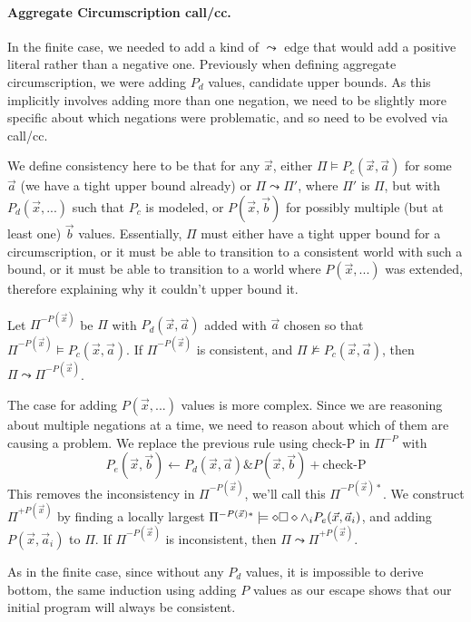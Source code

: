 \paragraph{Aggregate Circumscription call/cc.}
In the finite case, we needed to add a kind of $\leadsto$ edge that would add a positive literal rather than a negative one.
Previously when defining aggregate circumscription, we were adding $P_d$ values, candidate upper bounds.
As this implicitly involves adding more than one negation, we need to be slightly more specific about which negations were problematic, and so need to be evolved via call/cc.

We define consistency here to be that for any $\vec{x}$, either $\Pi \models P_c(\vec{x}, \vec{a})$ for some $\vec{a}$ (we have a tight upper bound already) or $\Pi \leadsto \Pi'$, where $\Pi'$ is $\Pi$, but with $P_d(\vec{x}, ...)$ such that $P_c$ is modeled, or $P(\vec{x}, \vec{b})$ for possibly multiple (but at least one) $\vec{b}$ values.
Essentially, $\Pi$ must either have a tight upper bound for a circumscription, or it must be able to transition to a consistent world with such a bound, or it must be able to transition to a world where $P(\vec{x}, ...)$ was extended, therefore explaining why it couldn't upper bound it.

Let $\Pi^{-P(\vec{x})}$ be $\Pi$ with $P_d(\vec{x}, \vec{a})$ added with $\vec{a}$ chosen so that $\Pi^{-P(\vec{x})} \models P_c(\vec{x}, \vec{a})$.
If $\Pi^{-P(\vec{x})}$ is consistent, and $\Pi \not \models P_c(\vec{x}, \vec{a})$, then $\Pi \leadsto \Pi^{-P(\vec{x})}$.

The case for adding $P(\vec{x}, ...)$ values is more complex.
Since we are reasoning about multiple negations at a time, we need to reason about which of them are causing a problem.
We replace the previous rule using check-P in $\Pi^{-P}$ with
\[
	P_e(\vec{x}, \vec{b}) \leftarrow P_d(\vec{x}, \vec{a}) \& P(\vec{x}, \vec{b}) + \textrm{check-P}
\]
This removes the inconsistency in $\Pi^{-P(\vec{x})}$, we'll call this $\Pi^{-P(\vec{x})*}$.
We construct $\Pi^{+P(\vec{x})}$ by finding a locally largest $\Pi^{-P(\vec{x})*} \models \diamond \square \diamond \wedge_i P_e(\vec{x}, \vec{a}_i)$, and adding $P(\vec{x}, \vec{a}_i)$ to $\Pi$.
If $\Pi^{-P(\vec{x})}$ is inconsistent, then $\Pi \leadsto \Pi^{+P(\vec{x})}$.

As in the finite case, since without any $P_d$ values, it is impossible to derive bottom, the same induction using adding $P$ values as our escape shows that our initial program will always be consistent.

